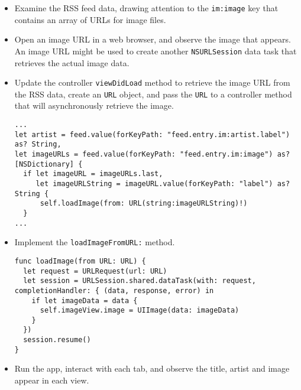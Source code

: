 \documentclass[a4paper,11pt]{scrartcl}
\begin{document}
\begin{itemize}
\item Examine the RSS feed data, drawing attention to the \texttt{im:image} key that contains an array of URLs for image files.
\item Open an image URL in a web browser, and observe the image that appears. An image URL might be used to create another \texttt{NSURLSession} data task that retrieves the actual image data.
\item Update the controller \texttt{viewDidLoad} method to retrieve the image URL from the RSS data, create an \texttt{URL} object, and pass the \texttt{URL} to a controller method that will asynchronously retrieve the image.
\begin{lstlisting}
...
let artist = feed.value(forKeyPath: "feed.entry.im:artist.label") as? String,
let imageURLs = feed.value(forKeyPath: "feed.entry.im:image") as? [NSDictionary] {
  if let imageURL = imageURLs.last,
     let imageURLString = imageURL.value(forKeyPath: "label") as? String {
      self.loadImage(from: URL(string:imageURLString)!)
  }
...
\end{lstlisting}
\item Implement the \texttt{loadImageFromURL:} method.
\begin{lstlisting}
func loadImage(from URL: URL) {
  let request = URLRequest(url: URL)
  let session = URLSession.shared.dataTask(with: request, completionHandler: { (data, response, error) in
    if let imageData = data {
      self.imageView.image = UIImage(data: imageData)
    }
  })
  session.resume()
}
\end{lstlisting}
\item Run the app, interact with each tab, and observe the title, artist and image appear in each view.
\end{itemize}
\end{document}

